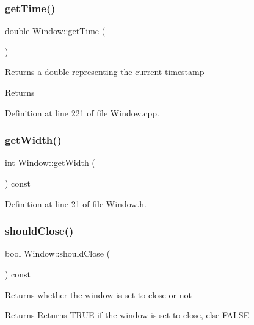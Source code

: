 \mbox{\label{class_window_a8a828ebd82becbc53c7754916be02b79}} 
\subsubsection{\texorpdfstring{get\+Time()}{getTime()}}
{\footnotesize\ttfamily double Window\+::get\+Time (\begin{DoxyParamCaption}{ }\end{DoxyParamCaption})}

Returns a double representing the current timestamp \begin{DoxyReturn}{Returns}

\end{DoxyReturn}


Definition at line 221 of file Window.\+cpp.

\mbox{\label{class_window_aee31a875d654a8c8f7d796d072657791}} 
\subsubsection{\texorpdfstring{get\+Width()}{getWidth()}}
{\footnotesize\ttfamily int Window\+::get\+Width (\begin{DoxyParamCaption}{ }\end{DoxyParamCaption}) const\hspace{0.3cm}{\ttfamily [inline]}}



Definition at line 21 of file Window.\+h.

\mbox{\label{class_window_a1caaf150558c0c35a8811f19ccac817d}} 
\subsubsection{\texorpdfstring{should\+Close()}{shouldClose()}}
{\footnotesize\ttfamily bool Window\+::should\+Close (\begin{DoxyParamCaption}{ }\end{DoxyParamCaption}) const}

Returns whether the window is set to close or not \begin{DoxyReturn}{Returns}
Returns T\+R\+UE if the window is set to close, else F\+A\+L\+SE 
\end{DoxyReturn}



